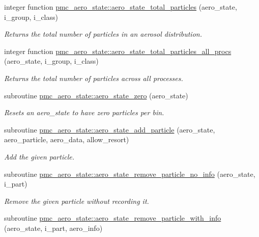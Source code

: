 \begin{DoxyCompactItemize}
integer function \mbox{\hyperlink{namespacepmc__aero__state_a9bfa000bf19e64be5f1cf5aeebabe535}{pmc\+\_\+aero\+\_\+state\+::aero\+\_\+state\+\_\+total\+\_\+particles}} (aero\+\_\+state, i\+\_\+group, i\+\_\+class)
\begin{DoxyCompactList}\small\item\em Returns the total number of particles in an aerosol distribution. \end{DoxyCompactList}\item 
integer function \mbox{\hyperlink{namespacepmc__aero__state_a38cf96ea2f1a3ee938bda68e93975cae}{pmc\+\_\+aero\+\_\+state\+::aero\+\_\+state\+\_\+total\+\_\+particles\+\_\+all\+\_\+procs}} (aero\+\_\+state, i\+\_\+group, i\+\_\+class)
\begin{DoxyCompactList}\small\item\em Returns the total number of particles across all processes. \end{DoxyCompactList}\item 
subroutine \mbox{\hyperlink{namespacepmc__aero__state_a748f903f70f90956fc02765c46f5e541}{pmc\+\_\+aero\+\_\+state\+::aero\+\_\+state\+\_\+zero}} (aero\+\_\+state)
\begin{DoxyCompactList}\small\item\em Resets an aero\+\_\+state to have zero particles per bin. \end{DoxyCompactList}\item 
subroutine \mbox{\hyperlink{namespacepmc__aero__state_a473f49b7a4680623facd70a44576b7e8}{pmc\+\_\+aero\+\_\+state\+::aero\+\_\+state\+\_\+add\+\_\+particle}} (aero\+\_\+state, aero\+\_\+particle, aero\+\_\+data, allow\+\_\+resort)
\begin{DoxyCompactList}\small\item\em Add the given particle. \end{DoxyCompactList}\item 
subroutine \mbox{\hyperlink{namespacepmc__aero__state_a87d926e9b2ca5930053d449d771efcee}{pmc\+\_\+aero\+\_\+state\+::aero\+\_\+state\+\_\+remove\+\_\+particle\+\_\+no\+\_\+info}} (aero\+\_\+state, i\+\_\+part)
\begin{DoxyCompactList}\small\item\em Remove the given particle without recording it. \end{DoxyCompactList}\item 
subroutine \mbox{\hyperlink{namespacepmc__aero__state_ad28b72502e5bb9caa40eac383d9bb22e}{pmc\+\_\+aero\+\_\+state\+::aero\+\_\+state\+\_\+remove\+\_\+particle\+\_\+with\+\_\+info}} (aero\+\_\+state, i\+\_\+part, aero\+\_\+info)

\end{DoxyCompactItemize}
